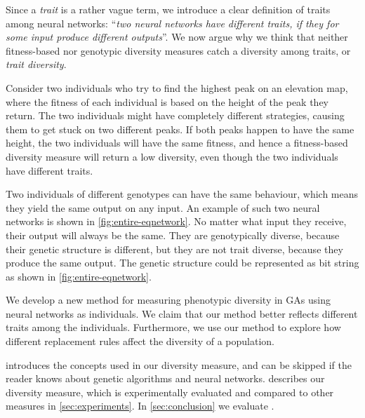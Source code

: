 Since a \emph{trait} is a rather vague term, we introduce a clear definition of traits among neural networks: ``\emph{two neural networks have different traits, if they for some input produce different outputs}''. We now argue why we think that neither fitness-based nor genotypic diversity measures catch a diversity among traits, or \emph{trait diversity}.

Consider two individuals who try to find the highest peak on an elevation map, where the fitness of each individual is based on the height of the peak they return. The two individuals might have completely different strategies, causing them to get stuck on two different peaks. If both peaks happen to have the same height, the two individuals will have the same fitness, and hence a fitness-based diversity measure will return a low diversity, even though the two individuals have different traits.

Two individuals of different genotypes can have the same behaviour, which means they yield the same output on any input. An example of such two neural networks is shown in \cref{fig:entire-eqnetwork}. No matter what input they receive, their output will always be the same. They are genotypically diverse, because their genetic structure is different, but they are not trait diverse, because they produce the same output. The genetic structure could be represented as bit string as shown in \cref{fig:entire-eqnetwork}.
%

%
We develop a new method for measuring phenotypic diversity in GAs using neural networks as individuals. We claim that our method better reflects different traits among the individuals. Furthermore, we use our method to explore how different replacement rules affect the diversity of a population.

 introduces the concepts used in our diversity measure, and can be skipped if the reader knows about genetic algorithms and neural networks.  describes our diversity measure, which is experimentally evaluated and compared to other measures in \cref{sec:experiments}. In \cref{sec:conclusion} we evaluate \dia.

